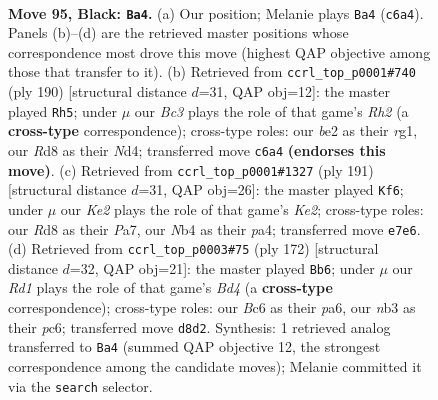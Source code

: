 \documentclass[11pt]{article}
\begin{document}
\clearpage

\begin{figure}[p]\centering
\begin{subfigure}{0.46\textwidth}\centering
\resizebox{\linewidth}{!}{%
\newchessgame
\chessboard[
  setfen={3r4/4kp2/2b3p1/4P3/1n3Ppp/1N6/4BK1P/8 b - - 5 95},
  showmover=false,
  pgfstyle=straightmove, color=movearrow, markmove={c6-a4}
]}
\caption{}
\end{subfigure}\hfill
\begin{subfigure}{0.46\textwidth}\centering
\resizebox{\linewidth}{!}{%
\newchessgame
\chessboard[
  setfen={5bk1/5p2/5P2/p3K1P1/P2N4/8/7R/6r1 w - - 12 96},
  showmover=false,
  pgfstyle=straightmove, color=movearrow, markmove={h2-h5}
]}
\caption{}
\end{subfigure}
\\[4pt]
\begin{subfigure}{0.46\textwidth}\centering
\resizebox{\linewidth}{!}{%
\newchessgame
\chessboard[
  setfen={8/p1b1kp2/7p/2p2p1P/P4P2/2PBK3/1P6/8 b - - 8 96},
  showmover=false,
  pgfstyle=straightmove, color=movearrow, markmove={e7-f6}
]}
\caption{}
\end{subfigure}\hfill
\begin{subfigure}{0.46\textwidth}\centering
\resizebox{\linewidth}{!}{%
\newchessgame
\chessboard[
  setfen={8/5k1p/p1p4P/5P2/p1pB1K2/2Pb4/1P6/8 w - - 74 87},
  showmover=false,
  pgfstyle=straightmove, color=movearrow, markmove={d4-b6}
]}
\caption{}
\end{subfigure}
\caption{\textbf{Move 95, Black: \texttt{Ba4}.} (a) Our position; Melanie plays \texttt{Ba4} (\texttt{c6a4}). Panels (b)--(d) are the retrieved master positions whose correspondence most drove this move (highest QAP objective among those that transfer to it). (b) Retrieved from \texttt{ccrl\_top\_p0001\#740} (ply 190) [structural distance $d$=31, QAP obj=12]: the master played \texttt{Rh5}; under $\mu$ our \emph{Bc3} plays the role of that game's \emph{Rh2} (a \textbf{cross-type} correspondence); cross-type roles: our \emph{b}e2 as their \emph{r}g1, our \emph{R}d8 as their \emph{N}d4; transferred move \texttt{c6a4} \textbf{(endorses this move)}. (c) Retrieved from \texttt{ccrl\_top\_p0001\#1327} (ply 191) [structural distance $d$=31, QAP obj=26]: the master played \texttt{Kf6}; under $\mu$ our \emph{Ke2} plays the role of that game's \emph{Ke2}; cross-type roles: our \emph{R}d8 as their \emph{P}a7, our \emph{N}b4 as their \emph{p}a4; transferred move \texttt{e7e6}. (d) Retrieved from \texttt{ccrl\_top\_p0003\#75} (ply 172) [structural distance $d$=32, QAP obj=21]: the master played \texttt{Bb6}; under $\mu$ our \emph{Rd1} plays the role of that game's \emph{Bd4} (a \textbf{cross-type} correspondence); cross-type roles: our \emph{B}c6 as their \emph{p}a6, our \emph{n}b3 as their \emph{p}c6; transferred move \texttt{d8d2}. Synthesis: 1 retrieved analog transferred to \texttt{Ba4} (summed QAP objective 12, the strongest correspondence among the candidate moves); Melanie committed it via the \texttt{search} selector.}
\label{fig:thought-m189}
\end{figure}
\end{document}
